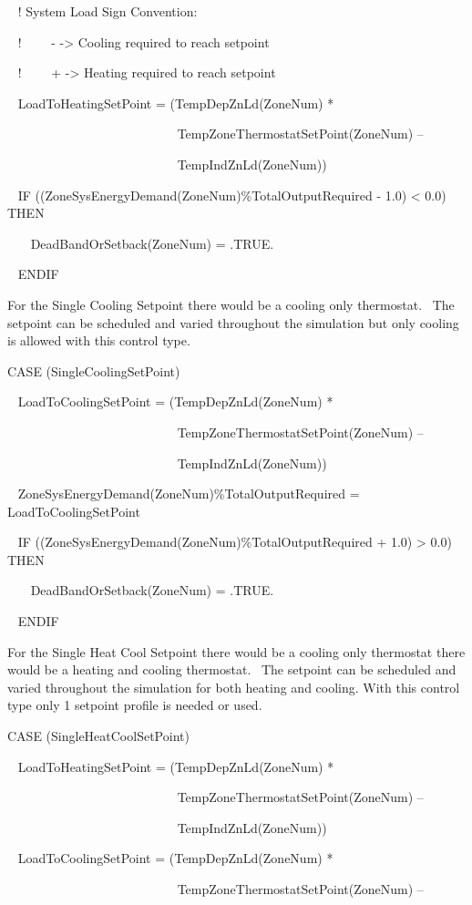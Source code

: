 ~ ! System Load Sign Convention:

~ !~~~~ - -\textgreater{} Cooling required to reach setpoint

~ !~~~~ + -\textgreater{} Heating required to reach setpoint

~ LoadToHeatingSetPoint = (TempDepZnLd(ZoneNum) *

~~~~~~~~~~~~~~~~~~~~~~~~~~ TempZoneThermostatSetPoint(ZoneNum) --

~~~~~~~~~~~~~~~~~~~~~~~~~~ TempIndZnLd(ZoneNum))

~ IF ((ZoneSysEnergyDemand(ZoneNum)\%TotalOutputRequired - 1.0) \textless{} 0.0) THEN

~~ ~DeadBandOrSetback(ZoneNum) = .TRUE.

~ ENDIF

For the Single Cooling Setpoint there would be a cooling only thermostat.~ The setpoint can be scheduled and varied throughout the simulation but only cooling is allowed with this control type.

CASE (SingleCoolingSetPoint)

~ LoadToCoolingSetPoint = (TempDepZnLd(ZoneNum) *

~~~~~~~~~~~~~~~~~~~~~~ ~~~~TempZoneThermostatSetPoint(ZoneNum) --

~~~~~~~~~~~~~~~~~~~~~~~~~~ TempIndZnLd(ZoneNum))

~ ZoneSysEnergyDemand(ZoneNum)\%TotalOutputRequired = LoadToCoolingSetPoint

~ IF ((ZoneSysEnergyDemand(ZoneNum)\%TotalOutputRequired + 1.0) \textgreater{} 0.0) THEN

~~~ DeadBandOrSetback(ZoneNum) = .TRUE.

~ ENDIF

For the Single Heat Cool Setpoint there would be a cooling only thermostat there would be a heating and cooling thermostat.~ The setpoint can be scheduled and varied throughout the simulation for both heating and cooling. With this control type only 1 setpoint profile is needed or used.

CASE (SingleHeatCoolSetPoint)

~ LoadToHeatingSetPoint = (TempDepZnLd(ZoneNum) *

~~~~~~~~~~~~~~~~~~~~~~~~~ ~TempZoneThermostatSetPoint(ZoneNum) --

~~~~~~~~~~~~~~~~~~~~~~~~~~ TempIndZnLd(ZoneNum))

~ LoadToCoolingSetPoint = (TempDepZnLd(ZoneNum) *

~~~~~~~~~~~~~~~~~~~~~~~~~ ~TempZoneThermostatSetPoint(ZoneNum) --

